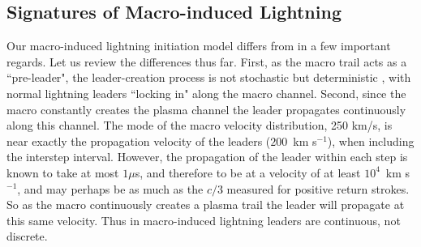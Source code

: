 \documentclass[%
 reprint,
 amsmath,amssymb,
 aps,
]{revtex4-2}
\newcommand{\vtwo}[1]{{\color{black} #1}}
\newcommand{\vfour}[1]{{\color{red} #1}}
\begin{document}

    \subsection{Signatures of Macro-induced Lightning} %
    \label{sec:signatures_of_macro_induced_lightning}

        Our macro-induced lightning initiation model differs from \vtwo{\citet{DwyerUman2014}} in a few important regards. \vfour{Let us review the differences thus far}. First, as the macro trail acts as a ``pre-leader", the \vfour{leader-creation} process is not stochastic but deterministic\vfour{, with normal lightning leaders ``locking in" along the macro channel}. Second, since the macro constantly creates the plasma channel the leader propagates continuously along this channel. The mode of the macro velocity distribution, 250 km/s, is near exactly the propagation velocity of the leaders ($200\,$ km s$^{-1}$), when including the \vtwo{interstep} interval. However, the propagation of the leader within each step is known to take at most $1\mu$s, and therefore to be at a velocity of at least $10^4\,$ km s$^{-1}$, and may perhaps be as much as the $c/3$ measured for positive return strokes. So as the macro continuously creates a plasma trail the leader will propagate at this same velocity. Thus in macro-induced lightning leaders are continuous, not discrete.
\end{document}
